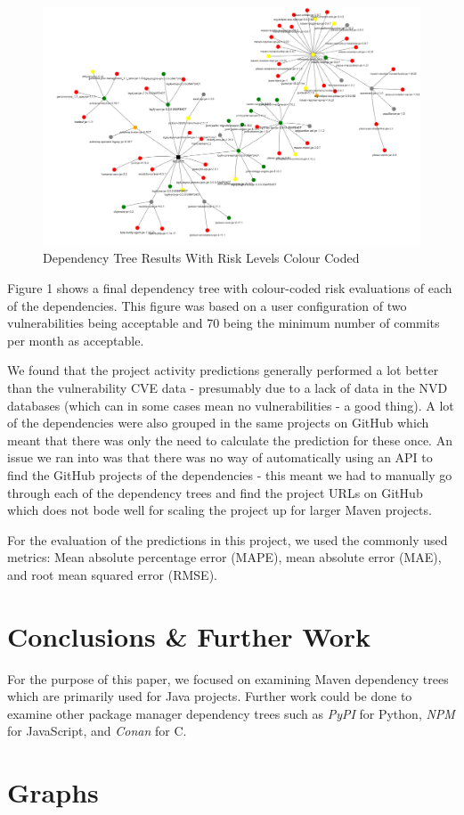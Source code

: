 \documentclass[10pt, compsoc, conference]{IEEEtran}
\begin{document}
\begin{figure}
    \centering
    \includegraphics[width=1\linewidth]{image.png}
    \caption{Dependency Tree Results With Risk Levels Colour Coded} 
\end{figure}

Figure 1 shows a final dependency tree with colour-coded risk evaluations of each of the dependencies. This figure was based on a user configuration of two vulnerabilities being acceptable and 70 being the minimum number of commits per month as acceptable. 

We found that the project activity predictions generally performed a lot better than the vulnerability CVE data - presumably due to a lack of data in the NVD databases (which can in some cases mean no vulnerabilities - a good thing). A lot of the dependencies were also grouped in the same projects on GitHub which meant that there was only the need to calculate the prediction for these once. An issue we ran into was that there was no way of automatically using an API to find the GitHub projects of the dependencies - this meant we had to manually go through each of the dependency trees and find the project URLs on GitHub which does not bode well for scaling the project up for larger Maven projects. 

For the evaluation of the predictions in this project, we used the commonly used metrics: Mean absolute percentage error (MAPE), mean absolute error (MAE), and root mean squared error (RMSE). 


\section{Conclusions \& Further Work}
For the purpose of this paper, we focused on examining Maven dependency trees which are primarily used for Java projects. Further work could be done to examine other package manager dependency trees such as \textit{PyPI} for Python, \textit{NPM} for JavaScript, and \textit{Conan} for C. 

\printbibliography

\appendices
\section{Graphs}

\ifCLASSOPTIONcaptionsoff
  \newpage
\fi
\end{document}
